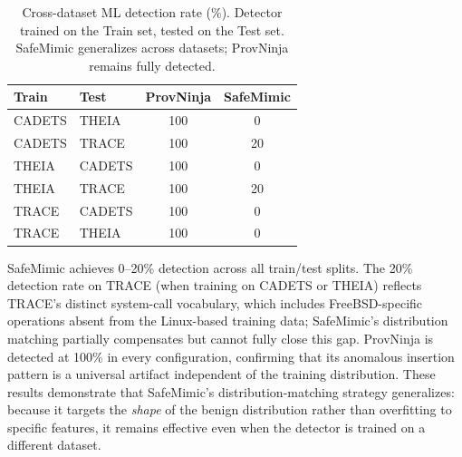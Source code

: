 \begin{table}[t]
\centering
\caption{Cross-dataset ML detection rate (\%). Detector trained on the Train set, tested on the Test set. SafeMimic generalizes across datasets; ProvNinja remains fully detected.}
\label{tab:crossdataset}
\small
\begin{tabular}{llcc}
\toprule
Train & Test & ProvNinja & SafeMimic \\
\midrule
CADETS & THEIA & 100 &  0 \\
CADETS & TRACE & 100 & 20 \\
THEIA  & CADETS & 100 &  0 \\
THEIA  & TRACE & 100 & 20 \\
TRACE  & CADETS & 100 &  0 \\
TRACE  & THEIA & 100 &  0 \\
\bottomrule
\end{tabular}
\end{table}

SafeMimic achieves 0--20\% detection across all train/test splits.
The 20\% detection rate on TRACE (when training on CADETS or THEIA) reflects TRACE's distinct system-call vocabulary, which includes FreeBSD-specific operations absent from the Linux-based training data; SafeMimic's distribution matching partially compensates but cannot fully close this gap.
ProvNinja is detected at 100\% in every configuration, confirming that its anomalous insertion pattern is a universal artifact independent of the training distribution.
These results demonstrate that SafeMimic's distribution-matching strategy generalizes: because it targets the \emph{shape} of the benign distribution rather than overfitting to specific features, it remains effective even when the detector is trained on a different dataset.
